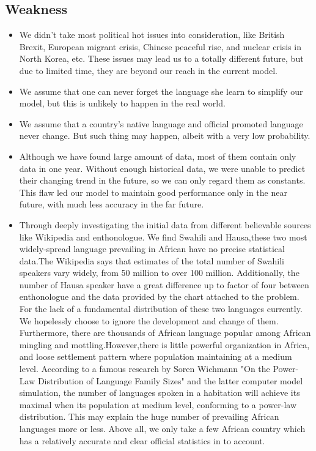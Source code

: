 \documentclass{mcmthesis}
\begin{document}
\subsection{Weakness}
\begin{itemize}
    \item We didn't take most political hot issues into consideration, like British Brexit, European migrant crisis, Chinese peaceful rise, and nuclear crisis in North Korea, etc. These issues may lead us to a totally different future, but due to limited time, they are beyond our reach in the current model.
    \item We assume that one can never forget the language she learn to simplify our model, but this is unlikely to happen in the real world.
    \item We assume that a country's native language and official promoted language never change. But such thing may happen, albeit with a very low probability.
    \item Although we have found large amount of data, most of them contain only data in one year. Without enough historical data, we were unable to predict their changing trend in the future, so we can only regard them as constants. This flaw led our model to maintain good performance only in the near future, with much less accuracy in the far future.
    \item Through deeply investigating the initial data from different believable sources like Wikipedia and enthonologue. We find Swahili and Hausa,these two most widely-spread language prevailing in African have no precise statistical data.The Wikipedia says that estimates of the total number of Swahili speakers vary widely, from 50 million to over 100 million. Additionally, the number of Hausa speaker have a great difference up to factor of four between enthonologue and the data provided by the chart attached to the problem. For the lack of a fundamental distribution of these two languages currently. We hopelessly choose to ignore the development and change of them.  
Furthermore, there are thousands of African language popular among African mingling and mottling.However,there is little powerful organization in Africa, and loose settlement pattern where population maintaining at a medium level. According to a famous research by Soren Wichmann "On the Power-Law Distribution of Language Family Sizes" and the latter computer model simulation, the number of languages spoken in a habitation will achieve its maximal when its population at  medium level, conforming to a power-law distribution. This may explain the huge number of prevailing African languages more or less.  
Above all, we only take a few African country which has a relatively accurate and clear official statistics in to account.
\end{itemize}
\end{document}
